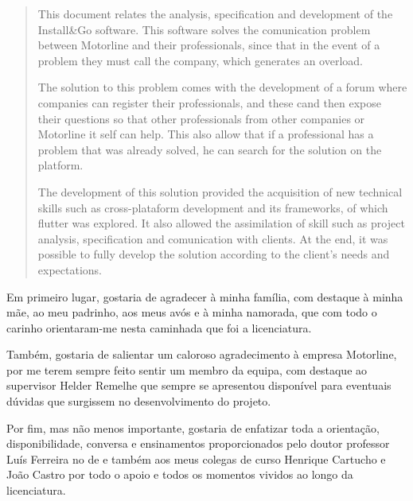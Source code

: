 \documentclass[a4paper,12pt,twoside]{book}
\begin{document}
\begin{abstract}
This document relates the analysis, specification and development of the Install\&Go software. This software solves the comunication problem between Motorline and their professionals, since that in the event of a problem they must call the company, which generates an overload.

The solution to this problem comes with the development of a forum where companies can register their professionals, and these cand then expose their questions so that other professionals from other companies or Motorline it self can help. This also allow that if a professional has a problem that was already solved, he can search for the solution on the platform.

The development of this solution provided the acquisition of new technical skills such as cross-plataform development and its frameworks, of which flutter was explored. It also allowed the assimilation of skill such as project analysis, specification and comunication with clients. At the end, it was possible to fully develop the solution according to the client's needs and expectations.

\end{abstract}

\begin{agradecimentos}

Em primeiro lugar, gostaria de agradecer à minha família, com destaque à minha mãe, ao meu padrinho, aos meus avós e à minha namorada, que com todo o carinho orientaram-me nesta caminhada que foi a licenciatura.

Também, gostaria de salientar um caloroso agradecimento à empresa Motorline, por me terem sempre feito sentir um membro da equipa, com destaque ao supervisor Helder Remelhe que sempre se apresentou disponível para eventuais dúvidas que surgissem no desenvolvimento do projeto.

Por fim, mas não menos importante, gostaria de enfatizar toda a orientação, disponibilidade, conversa e ensinamentos proporcionados pelo doutor professor Luís Ferreira no de e também aos meus colegas de curso Henrique Cartucho e João Castro por todo o apoio e todos os momentos vividos ao longo da licenciatura.
\end{agradecimentos}
\end{document}
